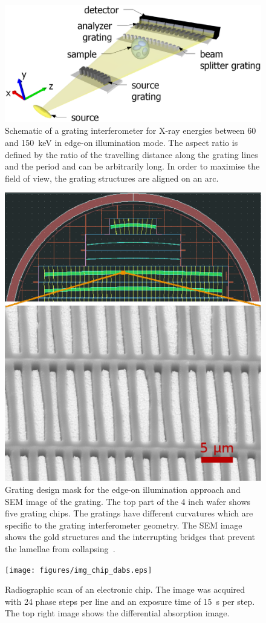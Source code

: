 \documentclass{pnastwo}
\begin{document}

\begin{figure}
    \includegraphics[width=.5\textwidth]{figures/figure1.eps}
    \caption{Schematic of a grating
        interferometer for X-ray energies between 60 and
        \SI{150}{\kilo\electronvolt} in edge-on illumination mode. The
        aspect ratio is defined by the ratio of the travelling distance along the
        grating lines and the period and can be arbitrarily long. In order to maximise
        the field of view, the grating structures are aligned on an
    arc.}
    \label{Fig:schematic}
\end{figure}

\begin{figure}
    \includegraphics[width=.5\textwidth]{figures/grating_mask.eps}
    \caption{Grating design mask for
        the edge-on illumination approach and SEM
        image of the grating. The top part of the 4 inch wafer shows
        five grating chips. The
        gratings have different curvatures which are specific to the grating
        interferometer geometry. 
        The SEM image shows the gold structures and the interrupting bridges
        that prevent the lamellae from collapsing~\cite{Kenntner2010}.}
        \label{Fig:grating_mask}
\end{figure}

\begin{figure}
    \texttt{[image: figures/img\_chip\_dabs.eps]}
    \caption{Radiographic scan of an electronic chip. The image was acquired
        with 24 phase steps per line and an exposure time of \SI{15}{\second} per
    step. The top right image shows the differential absorption image.}
    \label{Fig:img_chip}
\end{figure}
\end{document}
